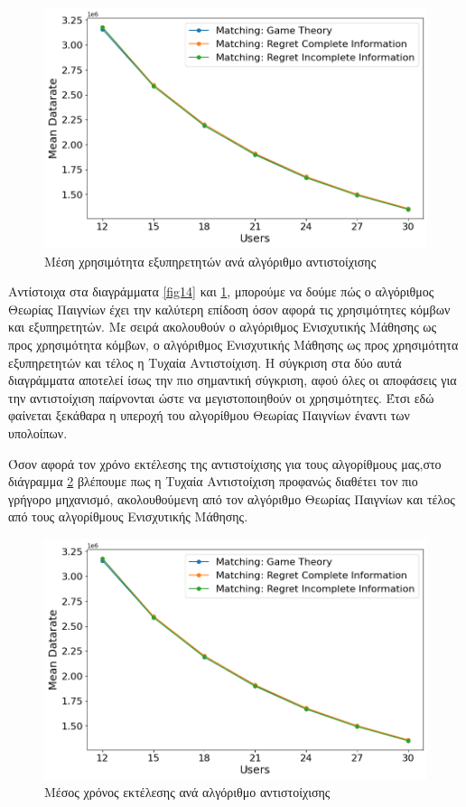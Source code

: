 \begin{figure}[H]
    \centering
    \includegraphics[width=\textwidth]{figures/chapter4/Mean_Datarate_vs_Users.png}
    \caption{Μέση χρησιμότητα εξυπηρετητών ανά αλγόριθμο αντιστοίχισης}
    \label{fig15}
\end{figure}

Αντίστοιχα στα διαγράμματα \ref*{fig14} και \ref*{fig15}, μπορούμε να δούμε πώς ο αλγόριθμος Θεωρίας Παιγνίων έχει την καλύτερη επίδοση όσον αφορά τις χρησιμότητες κόμβων και εξυπηρετητών. Με σειρά ακολουθούν ο αλγόριθμος Ενισχυτικής Μάθησης ως προς χρησιμότητα κόμβων, ο αλγόριθμος Ενισχυτικής Μάθησης ως προς χρησιμότητα εξυπηρετητών και τέλος η Τυχαία Αντιστοίχιση. Η σύγκριση στα δύο αυτά διαγράμματα αποτελεί ίσως την πιο σημαντική σύγκριση, αφού όλες οι αποφάσεις για την αντιστοίχιση παίρνονται ώστε να μεγιστοποιηθούν οι χρησιμότητες. Έτσι εδώ φαίνεται ξεκάθαρα η υπεροχή του αλγορίθμου Θεωρίας Παιγνίων έναντι των υπολοίπων.

Όσον αφορά τον χρόνο εκτέλεσης της αντιστοίχισης για τους αλγορίθμους μας,στο διάγραμμα \ref{fig16} βλέπουμε πως η Τυχαία Αντιστοίχιση προφανώς διαθέτει τον πιο γρήγορο μηχανισμό, ακολουθούμενη από τον αλγόριθμο Θεωρίας Παιγνίων και τέλος από τους αλγορίθμους Ενισχυτικής Μάθησης.

\begin{figure}[ht]
    \centering
    \includegraphics[width=\textwidth]{figures/chapter4/Mean_Datarate_vs_Users.png}
    \caption{Μέσος χρόνος εκτέλεσης ανά αλγόριθμο αντιστοίχισης}
    \label{fig16}
\end{figure}

